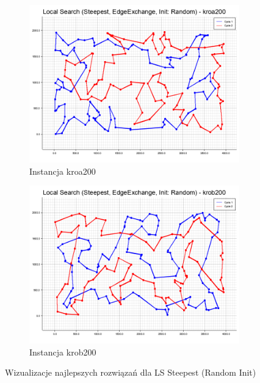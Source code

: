 \documentclass[12pt,a4paper]{article}
\begin{document}
\begin{figure}[H]
\begin{adjustwidth}{-1.5cm}{-1.5cm}
    \centering
    \begin{subfigure}[b]{0.6\textwidth}
        \centering
        \includegraphics[width=\textwidth]{figures/kroa200_Local_Search_Steepest_EdgeExchange_Init_Random_.png}
        \caption{Instancja kroa200}
        \label{fig:steepest_kroa200}
    \end{subfigure}
    \hfill
    \begin{subfigure}[b]{0.6\textwidth}
        \centering
        \includegraphics[width=\textwidth]{figures/krob200_Local_Search_Steepest_EdgeExchange_Init_Random_.png}
        \caption{Instancja krob200}
        \label{fig:steepest_krob200}
    \end{subfigure}
    \caption{Wizualizacje najlepszych rozwiązań dla LS Steepest (Random Init)}
    \label{fig:steepest}
\end{adjustwidth}
\end{figure}
\end{document}
